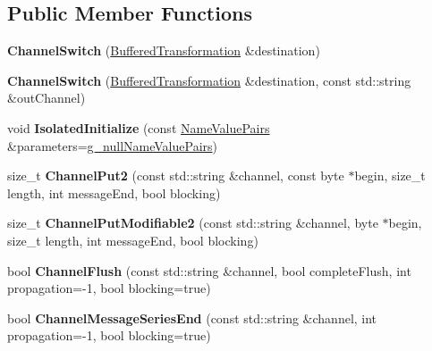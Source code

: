 \subsection*{Public Member Functions}
\begin{DoxyCompactItemize}
\item 
\hypertarget{class_channel_switch_a7b640d47d31ee18503048080e864d49c}{
{\bfseries ChannelSwitch} (\hyperlink{class_buffered_transformation}{BufferedTransformation} \&destination)}
\label{class_channel_switch_a7b640d47d31ee18503048080e864d49c}

\item 
\hypertarget{class_channel_switch_acc476e98db7dd18a2ce74f407affeda0}{
{\bfseries ChannelSwitch} (\hyperlink{class_buffered_transformation}{BufferedTransformation} \&destination, const std::string \&outChannel)}
\label{class_channel_switch_acc476e98db7dd18a2ce74f407affeda0}

\item 
\hypertarget{class_channel_switch_af663620f334464f987001187102bbb49}{
void {\bfseries IsolatedInitialize} (const \hyperlink{class_name_value_pairs}{NameValuePairs} \&parameters=\hyperlink{cryptlib_8h_ab1b0f7d11a21c6163be8ca2662ce2ac6}{g\_\-nullNameValuePairs})}
\label{class_channel_switch_af663620f334464f987001187102bbb49}

\item 
\hypertarget{class_channel_switch_a19e244d0593c91190858739b3240489c}{
size\_\-t {\bfseries ChannelPut2} (const std::string \&channel, const byte $\ast$begin, size\_\-t length, int messageEnd, bool blocking)}
\label{class_channel_switch_a19e244d0593c91190858739b3240489c}

\item 
\hypertarget{class_channel_switch_a914398ac6126fb975393a033ba3bd2d9}{
size\_\-t {\bfseries ChannelPutModifiable2} (const std::string \&channel, byte $\ast$begin, size\_\-t length, int messageEnd, bool blocking)}
\label{class_channel_switch_a914398ac6126fb975393a033ba3bd2d9}

\item 
\hypertarget{class_channel_switch_a35f25c2c035162f840088df46d905584}{
bool {\bfseries ChannelFlush} (const std::string \&channel, bool completeFlush, int propagation=-\/1, bool blocking=true)}
\label{class_channel_switch_a35f25c2c035162f840088df46d905584}

\item 
\hypertarget{class_channel_switch_a1459e69e94c5cd4aef42191635c07c1c}{
bool {\bfseries ChannelMessageSeriesEnd} (const std::string \&channel, int propagation=-\/1, bool blocking=true)}
\label{class_channel_switch_a1459e69e94c5cd4aef42191635c07c1c}


\end{DoxyCompactItemize}
